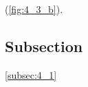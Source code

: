 \documentclass[../Dissertation]{subfiles}
\begin{document}
    \lipsum[64] (\cref{fig:4_3_b}).  
    
    \lipsum[64-69]
    

\subsection{Subsection}
    \lipsum[1-4] \cref{subsec:4_1} \lipsum[64]
\end{document}
